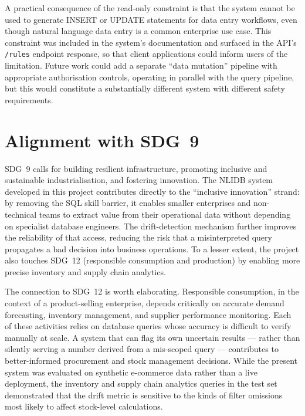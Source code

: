 \documentclass[12pt,a4paper]{report}
\begin{document}
A practical consequence of the read-only constraint is that the system cannot be used to generate INSERT or UPDATE statements for data entry workflows, even though natural language data entry is a common enterprise use case. This constraint was included in the system's documentation and surfaced in the API's \texttt{/rules} endpoint response, so that client applications could inform users of the limitation. Future work could add a separate ``data mutation'' pipeline with appropriate authorisation controls, operating in parallel with the query pipeline, but this would constitute a substantially different system with different safety requirements.

\section{Alignment with SDG~9}
\label{sec:sdg}

\ac{SDG}~9 calls for building resilient infrastructure, promoting inclusive and sustainable industrialisation, and fostering innovation. The \ac{NLIDB} system developed in this project contributes directly to the ``inclusive innovation'' strand: by removing the \ac{SQL} skill barrier, it enables smaller enterprises and non-technical teams to extract value from their operational data without depending on specialist database engineers. The drift-detection mechanism further improves the reliability of that access, reducing the risk that a misinterpreted query propagates a bad decision into business operations. To a lesser extent, the project also touches \ac{SDG}~12 (responsible consumption and production) by enabling more precise inventory and supply chain analytics.

The connection to \ac{SDG}~12 is worth elaborating. Responsible consumption, in the context of a product-selling enterprise, depends critically on accurate demand forecasting, inventory management, and supplier performance monitoring. Each of these activities relies on database queries whose accuracy is difficult to verify manually at scale. A system that can flag its own uncertain results — rather than silently serving a number derived from a mis-scoped query — contributes to better-informed procurement and stock management decisions. While the present system was evaluated on synthetic e-commerce data rather than a live deployment, the inventory and supply chain analytics queries in the test set demonstrated that the drift metric is sensitive to the kinds of filter omissions most likely to affect stock-level calculations.
\end{document}
